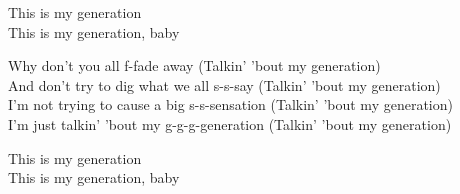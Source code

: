 \documentclass[landscape,final,a0paper,fontscale=0.26]{baposter}
\begin{document}
\begin{poster}
{\begin{multicols}{2}
This is my generation\\
This is my generation, baby\\
\bigskip

Why don't you all f-fade away (Talkin' 'bout my generation)\\
And don't try to dig what we all s-s-say (Talkin' 'bout my generation)\\
I'm not trying to cause a big s-s-sensation (Talkin' 'bout my generation)\\
I'm just talkin' 'bout my g-g-g-generation (Talkin' 'bout my generation)\\
\bigskip

This is my generation\\
This is my generation, baby\\

\end{multicols}
}





\end{poster}
\end{document}
